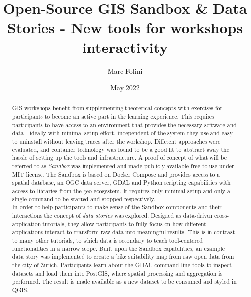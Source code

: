 \documentclass[11pt, a4paper, oneside, parskip=full-]{scrartcl}
\title{Open-Source GIS Sandbox \& Data Stories - New tools for workshops interactivity}
\author{Marc Folini}
\date{May 2022}
\begin{document}
\begin{titlepage}
\setcounter{page}{1}
\clearpage\maketitle
\thispagestyle{empty}
\begin{abstract}
GIS workshops benefit from supplementing theoretical concepts with exercises for
participants to become an active part in the learning experience. This requires
participants to have access to an environment that provides the necessary
software and data - ideally with minimal setup effort, independent of the system
they use and easy to uninstall without leaving traces after the workshop.
Different approaches were evaluated, and container technology was found to be a
good fit to abstract away the hassle of setting up the tools and infrastructure.
A proof of concept of what will be referred to as \emph{Sandbox} was implemented
and made publicly available free to use under MIT license. The Sandbox is based
on Docker Compose and provides access to a spatial database, an OGC data server,
GDAL and Python scripting capabilities with access to libraries from the
geo-ecosystem. It requires only minimal setup and only a single command to be
started and stopped respectively.\\

In order to help participants to make sense of the Sandbox components and their
interactions the concept of \emph{data stories} was explored. Designed as
data-driven cross-application tutorials, they allow participants to fully focus
on how different applications interact to transform raw data into meaningful
results. This is in contrast to many other tutorials, to which data is secondary
to teach tool-centered functionalities in a narrow scope. Built upon the Sandbox
capabilities, an example data story was implemented to create a bike suitability
map from raw open data from the city of Zürich. Participants learn about the
GDAL command line tools to inspect datasets and load them into PostGIS, where
spatial processing and aggregation is performed. The result is made available as
a new dataset to be consumed and styled in QGIS.
\end{abstract}
\end{titlepage}

\newpage
\tableofcontents
\end{document}
